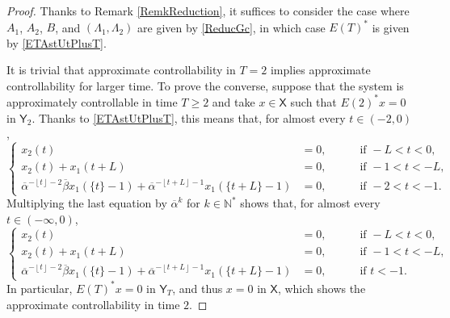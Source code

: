 \documentclass[10pt]{article}
\theoremstyle{plain}
\theoremstyle{definition}
\newcommand{\floor}[1]{\left\lfloor #1 \right\rfloor}
\numberwithin{equation}{section}\numberwithin{figure}{section}\emergencystretch=3em
\begin{document}
\begin{proof}
Thanks to Remark \ref{RemkReduction}, it suffices to consider the case where $A_1$, $A_2$, $B$, and $(\Lambda_1, \Lambda_2)$ are given by \eqref{ReducGc}, in which case $E(T)^\ast$ is given by \eqref{ETAstUtPlusT}.

It is trivial that approximate controllability in $T = 2$ implies approximate controllability for larger time. To prove the converse, suppose that the system is approximately controllable in time $T \geq 2$ and take $x \in \mathsf X$ such that $E(2)^\ast x = 0$ in $\mathsf Y_2$. Thanks to \eqref{ETAstUtPlusT}, this means that, for almost every $t \in (-2, 0)$,
\[
\left\{
\begin{aligned}
x_2(t) & = 0, & \quad & \text{ if } -L < t < 0, \\
x_2(t) + x_1(t + L) & = 0, & & \text{ if } -1 < t < -L, \\
\overline\alpha^{-\floor{t} - 2} \overline\beta x_1(\{t\} - 1) + \overline\alpha^{-\floor{t + L} - 1} x_1(\{t + L\} - 1) & = 0, & & \text{ if } -2 < t < -1.
\end{aligned}
\right.
\]
Multiplying the last equation by $\overline\alpha^k$ for $k \in \mathbb N^\ast$ shows that, for almost every $t \in (-\infty, 0)$,
\[
\left\{
\begin{aligned}
x_2(t) & = 0, & \quad & \text{ if } -L < t < 0, \\
x_2(t) + x_1(t + L) & = 0, & & \text{ if } -1 < t < -L, \\
\overline\alpha^{-\floor{t} - 2} \overline\beta x_1(\{t\} - 1) + \overline\alpha^{-\floor{t + L} - 1} x_1(\{t + L\} - 1) & = 0, & & \text{ if } t < -1.
\end{aligned}
\right.
\]
In particular, $E(T)^\ast x = 0$ in $\mathsf Y_T$, and thus $x = 0$ in $\mathsf X$, which shows the approximate controllability in time $2$.


\end{proof}
\end{document}
